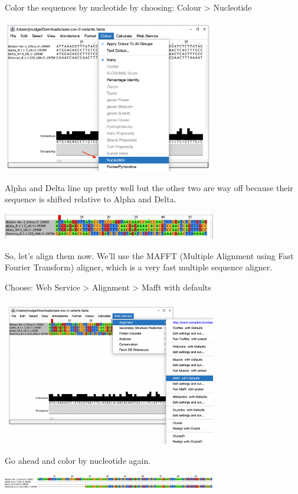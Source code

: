 \documentclass[
]{book}
\begin{document}
Color the sequences by nucleotide by choosing:
Colour \textgreater{} Nucleotide

\includegraphics[width=0.7\textwidth,height=\textheight]{./Figures/color.png}

Alpha and Delta line up pretty well but the other two are way off because their sequence is shifted relative to Alpha and Delta.

\includegraphics[width=0.7\textwidth,height=\textheight]{./Figures/unaligned.png}

So, let's align them now. We'll use the MAFFT (Multiple Alignment using Fast Fourier Transform) aligner, which is a very fast multiple sequence aligner.

Choose:
Web Service \textgreater{} Alignment \textgreater{} Mafft with defaults

\includegraphics[width=0.7\textwidth,height=\textheight]{./Figures/mafft_jalview.png}

Go ahead and color by nucleotide again.

\includegraphics[width=0.7\textwidth,height=\textheight]{./Figures/aligned.png}
\end{document}
